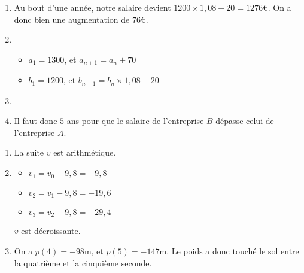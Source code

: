 \documentclass[
	classe=$1^{ere}STI2D$
]{évaluation}
\begin{document}
\begin{exercice}
	\begin{enumerate}
		\item Au bout d'une année, notre salaire devient $1200 × 1,08 - 20 = 1276$€. On a donc bien une augmentation de $76$€.
		\item \begin{itemize}
			      \item $a_1 = 1300$, et $a_{n+1} = a_n + 70$
			      \item $b_1 = 1200$, et $b_{n+1} = b_n × 1,08 - 20$
		      \end{itemize}
		\item
		\item Il faut donc $5$ ans pour que le salaire de l'entreprise $B$ dépasse celui de l'entreprise $A$.
	\end{enumerate}
\end{exercice}

\begin{exercice}
	\begin{enumerate}
		\item La suite $v$ est arithmétique.
		\item \begin{multicols}{3}
			      \begin{itemize}
				      \item $v_1 = v_0 - 9,8 = -9,8$
				      \item $v_2 = v_1 - 9,8 = -19,6$
				      \item $v_3 = v_2 - 9,8 = -29,4$
			      \end{itemize}
		      \end{multicols}
		      $v$ est décroissante.
		\item On a $p(4) = -98$m, et $p(5) = -147$m. Le poids a donc touché le sol entre la quatrième et la cinquième seconde.
	\end{enumerate}
\end{exercice}
\end{document}
